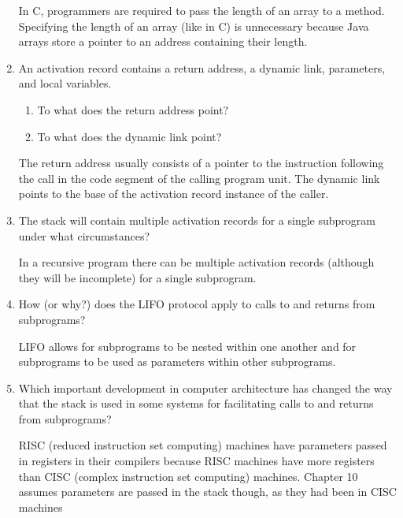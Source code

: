 \begin{enumerate}
  \begin{answer}
   In C, programmers are required to pass the length of an array to a method. Specifying the length of an array (like in C) is unnecessary because Java arrays store a pointer to an address containing their length.
  \end{answer}

  \item An activation record contains a return
    address, a dynamic link, parameters, and
    local variables.
  \begin{enumerate}
    \item To what does the return address point?
    \item To what does the dynamic link point?
    \end{enumerate}

  \begin{answer}
  The return address usually consists of a pointer to the instruction following the call in the code segment of the calling program unit.  The dynamic link points to the base of the activation record instance of the caller.

  \end{answer}
  \item The stack will contain multiple activation
    records for a single subprogram under what
    circumstances?

  \begin{answer}
  In a recursive program there can be multiple activation records (although they will be incomplete) for a single subprogram.

  \end{answer}

  \item How (or why?) does the LIFO protocol apply to
    calls to and returns from subprograms?

  \begin{answer}
  LIFO allows for subprograms to be nested within one another and for subprograms to be used as parameters within other subprograms.
  \end{answer}

  \item Which important development in computer architecture
    has changed the way that the stack is used in some
    systems for facilitating calls to and returns from
    subprograms?

  \begin{answer}
  
RISC (reduced instruction set computing) machines have parameters passed in registers in their compilers because RISC machines have more registers than CISC (complex instruction set computing) machines. Chapter 10 assumes parameters are passed in the stack though, as they had been in CISC machines


\end{answer}
\end{enumerate}

